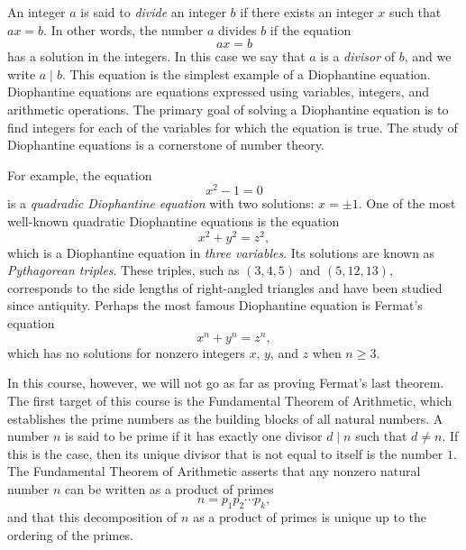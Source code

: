\documentclass{article}
\theoremstyle{definition}
\theoremstyle{remark}
\begin{document}
An integer $a$ is said to \emph{divide} an integer $b$ if there exists an integer $x$ such that $ax=b$. In other words, the number $a$ divides $b$ if the equation
\begin{equation*}
  ax=b  
\end{equation*}
has a solution in the integers. In this case we say that $a$ is a \emph{divisor} of $b$, and we write $a \mid b$. This equation is the simplest example of a Diophantine equation. Diophantine equations are equations expressed using variables, integers, and arithmetic operations. The primary goal of solving a Diophantine equation is to find integers for each of the variables for which the equation is true. The study of Diophantine equations is a cornerstone of number theory.

For example, the equation
\begin{equation*}
  x^2 - 1 = 0
\end{equation*}
is a \emph{quadradic Diophantine equation} with two solutions: $x=\pm 1$. One of the most well-known quadratic Diophantine equations is the equation
\begin{equation*}
  x^2 + y^2 = z^2,
\end{equation*}
which is a Diophantine equation in \emph{three variables}. Its solutions are known as \emph{Pythagorean triples}. These triples, such as $(3,4,5)$ and $(5,12,13)$, corresponds to the side lengths of right-angled triangles and have been studied since antiquity. Perhaps the most famous Diophantine equation is Fermat's equation
\begin{equation*}
  x^n + y^n = z^n,
\end{equation*}
which has no solutions for nonzero integers $x$, $y$, and $z$ when $n\geq 3$.

In this course, however, we will not go as far as proving Fermat's last theorem. The first target of this course is the Fundamental Theorem of Arithmetic, which establishes the prime numbers as the building blocks of all natural numbers. A number $n$ is said to be prime if it has exactly one divisor $d \mid n$ such that $d\neq n$. If this is the case, then its unique divisor that is not equal to itself is the number $1$. The Fundamental Theorem of Arithmetic asserts that any nonzero natural number $n$ can be written as a product of primes
\begin{equation*}
  n=p_1p_2\cdots p_k,
\end{equation*}
and that this decomposition of $n$ as a product of primes is unique up to the ordering of the primes.
\end{document}
